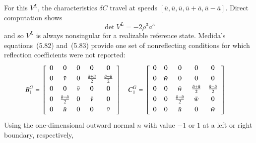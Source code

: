 \documentclass[letterpaper,11pt,nointlimits,reqno,draft]{amsbook}
\begin{document}
For this $V^L$, the characteristics $\delta{}C$ travel at speeds
$\left[\bar{u}, \bar{u}, \bar{u}, \bar{u}+\bar{a}, \bar{u}-\bar{a}\right]$.
Direct computation shows
\[
  \det V^L = -2\bar{\rho}^3\bar{a}^5
\]
and so $V^L$ is always nonsingular for a realizable reference state.  Medida's
equations~(5.82) and~(5.83) provide one set of nonreflecting conditions for
which reflection coefficients were not reported:
\begin{align}
\label{eq:dimeulerapproxmedidaopt1}
  B^G_1 &= \left[\begin{array}{ccccc}
    0 & 0                         & 0       & 0                           & 0                         \\ \noalign{\smallskip}
    0 & \bar{v}                   & 0       & \frac{\bar{a} + \bar{u}}{2} & \frac{\bar{a}-\bar{u}}{2} \\ \noalign{\smallskip}
    0 & 0                         & \bar{v} & 0                           & 0                         \\ \noalign{\smallskip}
    0 & \frac{\bar{a}-\bar{u}}{2} & 0       & \bar{v}                     & 0                         \\ \noalign{\smallskip}
    0 & \bar{u}                   & 0       & 0                           & \bar{v}                   \\ \noalign{\smallskip}
  \end{array}\right]
&
  C^G_1 &= \left[\begin{array}{ccccc}
    0 & 0       & 0                         & 0                         & 0                         \\ \noalign{\smallskip}
    0 & \bar{w} & 0                         & 0                         & 0                         \\ \noalign{\smallskip}
    0 & 0       & \bar{w}                   & \frac{\bar{a}+\bar{u}}{2} & \frac{\bar{a}-\bar{u}}{2} \\ \noalign{\smallskip}
    0 & 0       & \frac{\bar{a}-\bar{u}}{2} & \bar{w}                   & 0                         \\ \noalign{\smallskip}
    0 & 0       & \bar{u}                   & 0                         & \bar{w}                   \\ \noalign{\smallskip}
  \end{array}\right]
\end{align}
Using the one-dimensional outward normal $n$ with value $-1$ or $1$ at a left
or right boundary, respectively,
\end{document}
